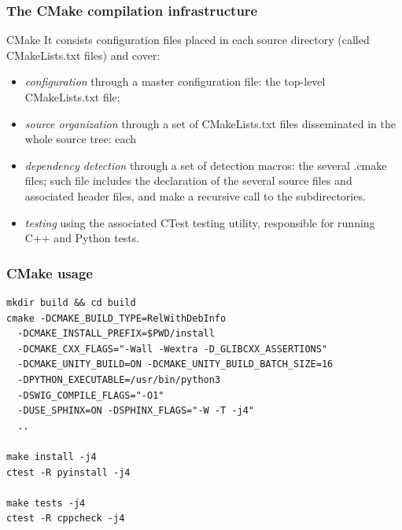\documentclass[8pt]{beamer}
\begin{document}
\begin{frame}
  \frametitle{The CMake compilation infrastructure}
  \begin{block}{CMake}
    It consists configuration files placed in each source directory (called CMakeLists.txt files) and cover:
    \begin{itemize}
    \item \emph{configuration} through a master configuration file: the top-level CMakeLists.txt file;
    \item \emph{source organization} through a set of CMakeLists.txt files disseminated in the whole source tree: each
    \item \emph{dependency detection} through a set of detection macros: the several .cmake files;
        such file includes the declaration of the several source files and associated header files, and make a recursive call to the subdirectories.
    \item \emph{testing} using the associated CTest testing utility, responsible for running C++ and Python tests.
    \end{itemize}
  \end{block}
\end{frame}

\begin{frame}[fragile]
  \frametitle{CMake usage}

  \lstset{style=mystyle}
  
\begin{lstlisting}
mkdir build && cd build
cmake -DCMAKE_BUILD_TYPE=RelWithDebInfo
  -DCMAKE_INSTALL_PREFIX=$PWD/install
  -DCMAKE_CXX_FLAGS="-Wall -Wextra -D_GLIBCXX_ASSERTIONS"
  -DCMAKE_UNITY_BUILD=ON -DCMAKE_UNITY_BUILD_BATCH_SIZE=16
  -DPYTHON_EXECUTABLE=/usr/bin/python3
  -DSWIG_COMPILE_FLAGS="-O1"
  -DUSE_SPHINX=ON -DSPHINX_FLAGS="-W -T -j4"
  ..

make install -j4
ctest -R pyinstall -j4

make tests -j4
ctest -R cppcheck -j4
\end{lstlisting}

\end{frame}

\end{document}
